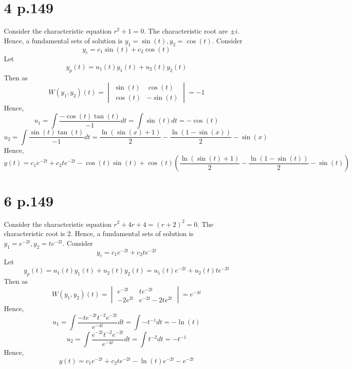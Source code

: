 \documentclass[11pt]{article}
\begin{document}
\section*{4 p.149}
Consider the characteristic equation $r^2+1= 0$. The characteristic root are $\pm i$.
Hence, a fundamental sets of solution is $y_1 = \sin(t) , y_2 = \cos(t)$. 
Consider 
\[
    y_c = c_1\sin(t) + c_2\cos(t)  
\]
Let 
\[
    y_p(t) = u_1(t)y_1(t) + u_2(t)y_2(t)   
\]
Then as 
\[
    W(y_1,y_2)(t) = 
    \begin{vmatrix}
        \sin(t) & \cos(t) \\
        \cos(t) & -\sin(t)
    \end{vmatrix} = -1
\]
Hence, 
\[
    u_1 = \int \frac{-\cos(t) \tan(t)}{-1} dt = \int \sin(t)dt =    -\cos(t)
\]
\[
    u_2 = \int \frac{\sin(t) \tan(t)}{-1} dt = \dfrac{\ln\left(\sin\left(x\right)+1\right)}{2}-\dfrac{\ln\left(1-\sin\left(x\right)\right)}{2}-\sin\left(x\right)
\]
Hence, 
\[
    y(t) = c_1e^{-2t} + c_2te^{-2t} - \cos(t)\sin(t) + \cos(t)\left(\dfrac{\ln\left(\sin\left(t\right)+1\right)}{2}-\dfrac{\ln\left(1-\sin\left(t\right)\right)}{2}-\sin\left(t\right)\right)
\]
\newpage
\section*{6 p.149}
Consider the characteristic equation $r^2+4r+4= (r+2)^2 = 0$. The characteristic root is $2$.
Hence, a fundamental sets of solution is $y_1 = e^{-2t}, y_2 = te^{-2t}$. 
Consider 
\[
    y_c = c_1e^{-2t} + c_2te^{-2t}    
\]
Let 
\[
    y_p(t) = u_1(t)y_1(t) + u_2(t)y_2(t) = u_1(t) e^{-2t} + u_2(t)te^{-2t}    
\]
Then as 
\[
    W(y_1,y_2)(t) = 
    \begin{vmatrix}
        e^{-2t} & te^{-2t} \\
        -2e^{2t} & e^{-2t} - 2te^{2t}
    \end{vmatrix} = e^{-4t}
\]
Hence, 
\[
    u_1 = \int \frac{-te^{-2t} t^{-2}e^{-2t}}{e^{-4t}} dt = \int -t^{-1} dt =    -\ln(t)
\]
\[
    u_2 = \int \frac{e^{-2t} t^{-2}e^{-2t}}{e^{-4t}} dt = \int t^{-2} dt = -t^{-1}
\]
Hence, 
\[
    y(t) = c_1e^{-2t} + c_2te^{-2t} -\ln(t)e^{-2t} - e^{-2t}
\]
\newpage
\end{document}
